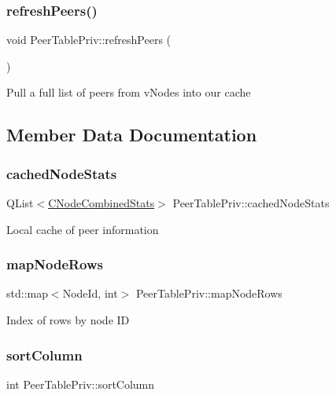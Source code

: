 \subsubsection{\texorpdfstring{refreshPeers()}{refreshPeers()}}
{\footnotesize\ttfamily void Peer\+Table\+Priv\+::refresh\+Peers (\begin{DoxyParamCaption}{ }\end{DoxyParamCaption})\hspace{0.3cm}{\ttfamily [inline]}}

Pull a full list of peers from v\+Nodes into our cache 

\subsection{Member Data Documentation}
\mbox{\label{class_peer_table_priv_a8da9d0256d11f205dfa1cdce86843761}} 
\subsubsection{\texorpdfstring{cachedNodeStats}{cachedNodeStats}}
{\footnotesize\ttfamily Q\+List$<$\mbox{\hyperlink{struct_c_node_combined_stats}{C\+Node\+Combined\+Stats}}$>$ Peer\+Table\+Priv\+::cached\+Node\+Stats}

Local cache of peer information \mbox{\label{class_peer_table_priv_ae27db14bcbe769f494c4db56ef27fb08}} 
\subsubsection{\texorpdfstring{mapNodeRows}{mapNodeRows}}
{\footnotesize\ttfamily std\+::map$<$Node\+Id, int$>$ Peer\+Table\+Priv\+::map\+Node\+Rows}

Index of rows by node ID \mbox{\label{class_peer_table_priv_a4917597853d2d5f0055be017b8ab33c5}} 
\subsubsection{\texorpdfstring{sortColumn}{sortColumn}}
{\footnotesize\ttfamily int Peer\+Table\+Priv\+::sort\+Column}

